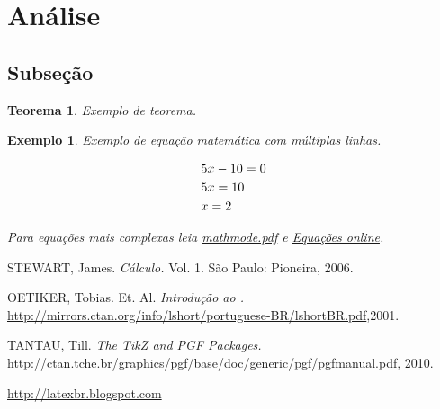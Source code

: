 \documentclass[a4paper]{report} %
\newtheorem{teo}{Teorema}[chapter] %
\newtheorem{ex}{Exemplo}[chapter] %
\begin{document}
\section{Análise}
\label{sec_segundo}

\subsection{Subse\c c\~ao}
\label{subsec_nome}

\begin{teo}
Exemplo de teorema.
\end{teo}

\begin{ex}
Exemplo de equa\c c\~ao matem\'atica com m\'ultiplas linhas.

\[
\begin{gathered}
  5x - 10 = 0 \hfill \\
  5x = 10 \hfill \\
  x = 2 \hfill \\ 
\end{gathered} 
\]

Para equa\c c\~oes mais complexas leia \href{http://ctan.tche.br/help/Catalogue/entries/voss-mathmode.html}{mathmode.pdf} e \href{http://latexbr.blogspot.com/2010/11/editor-de-equacoes-online.html}{Equa\c c\~oes online}.
\end{ex}

\begin{thebibliography}{99}
 STEWART, James. {\sl C\'alculo.} Vol. 1. S\~ao Paulo: Pioneira, 2006.

OETIKER, Tobias. Et. Al. {\sl Introdu\c c\~ao ao {\LaTeXe}.}
\url{http://mirrors.ctan.org/info/lshort/portuguese-BR/lshortBR.pdf},2001.

TANTAU, Till. {\sl The TikZ and PGF Packages.}
\url{http://ctan.tche.br/graphics/pgf/base/doc/generic/pgf/pgfmanual.pdf}, 2010.

\url{http://latexbr.blogspot.com}
\end{thebibliography}

\end{document}
